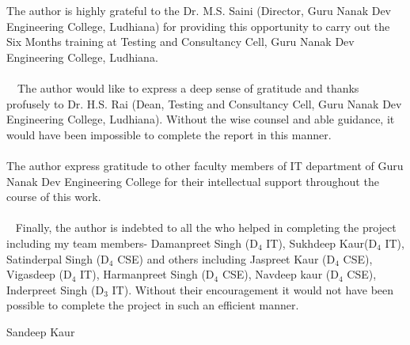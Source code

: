 
\begin{Large}
\end{Large}
The author is highly grateful to the Dr. M.S. Saini (Director, Guru Nanak Dev Engineering College, Ludhiana) for providing this opportunity to carry out the Six Months training at Testing and Consultancy Cell, Guru Nanak Dev Engineering College, Ludhiana.\\ \\
  The author would like to express a deep sense of gratitude and thanks profusely to Dr. H.S. Rai (Dean, Testing and Consultancy Cell, Guru Nanak Dev Engineering College, Ludhiana). Without the wise counsel and able guidance, it would have been impossible to complete the report in this manner. \\ \\
The author express gratitude to other faculty members of IT department of Guru Nanak Dev Engineering College for their intellectual support throughout the course of this work.\\ \\
 
Finally, the author is indebted to all the who helped in completing the project including my team members- Damanpreet Singh (D$_4$ IT), Sukhdeep Kaur(D$_4$ IT), Satinderpal Singh (D$_4$ CSE) and others including Jaspreet Kaur (D$_4$ CSE), Vigasdeep (D$_4$ IT), Harmanpreet Singh (D$_4$ CSE), Navdeep kaur (D$_4$ CSE), Inderpreet Singh (D$_3$ IT). Without their encouragement it would not have been possible to complete the project in such an efficient manner. 

\vskip 3.5cm
Sandeep Kaur
